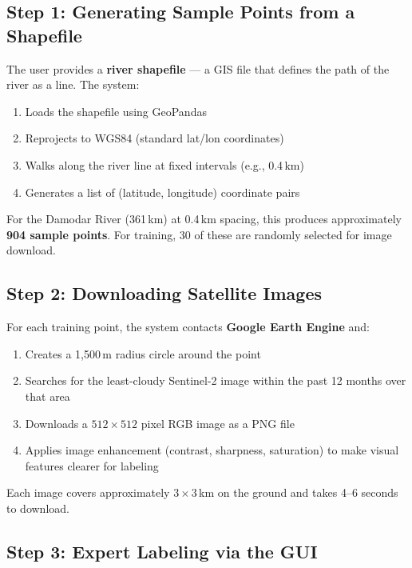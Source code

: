 \documentclass[12pt, a4paper]{article}
\begin{document}
\subsection{Step 1: Generating Sample Points from a Shapefile}

The user provides a \textbf{river shapefile} --- a GIS file that
defines the path of the river as a line. The system:

\begin{enumerate}[noitemsep]
  \item Loads the shapefile using GeoPandas
  \item Reprojects to WGS84 (standard lat/lon coordinates)
  \item Walks along the river line at fixed intervals (e.g., 0.4\,km)
  \item Generates a list of (latitude, longitude) coordinate pairs
\end{enumerate}

For the Damodar River (361\,km) at 0.4\,km spacing, this produces
approximately \textbf{904 sample points}. For training, 30 of these
are randomly selected for image download.

\subsection{Step 2: Downloading Satellite Images}

For each training point, the system contacts \textbf{Google Earth Engine}
and:

\begin{enumerate}[noitemsep]
  \item Creates a 1,500\,m radius circle around the point
  \item Searches for the least-cloudy Sentinel-2 image within the
        past 12 months over that area
  \item Downloads a $512 \times 512$ pixel RGB image as a PNG file
  \item Applies image enhancement (contrast, sharpness, saturation)
        to make visual features clearer for labeling
\end{enumerate}

Each image covers approximately $3 \times 3$\,km on the ground and
takes 4--6 seconds to download.

\subsection{Step 3: Expert Labeling via the GUI}
\end{document}
